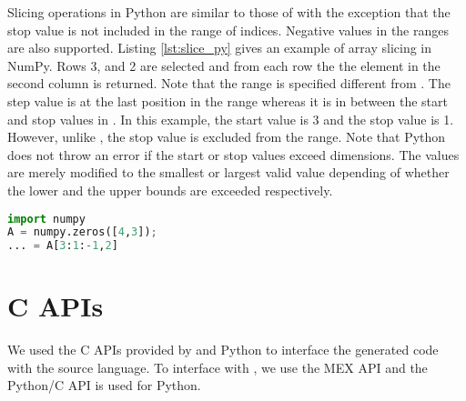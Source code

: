 Slicing operations in Python are similar to those of \matlab with the exception that the stop value is not included in the range of indices. Negative values in the ranges are also supported. Listing \ref{lst:slice_py} gives an example of array slicing in NumPy. Rows 3, and 2 are selected and from each row the the element in the second column is returned. Note that the range is specified different from \matlab. The step value is at the last position in the range whereas it is in between the start and stop values in \matlab. In this example, the start value is 3 and the stop value is 1. However, unlike \matlab, the stop value is excluded from the range. Note that Python does not throw an error if the start or stop values exceed dimensions. The values are merely modified to the smallest or largest valid value depending of whether the lower and the upper bounds are exceeded respectively. 
\begin{lstlisting}[float,language=python, label={lst:slice_py}, caption={An example of array slicing in NumPy}]
import numpy
A = numpy.zeros([4,3]);
... = A[3:1:-1,2]
\end{lstlisting}
\section{C APIs}
We used the C APIs provided by \matlab and Python to interface the generated code with the source language. To interface with \matlab, we use the MEX\cite{mex} API and the Python/C API is used for Python. 
